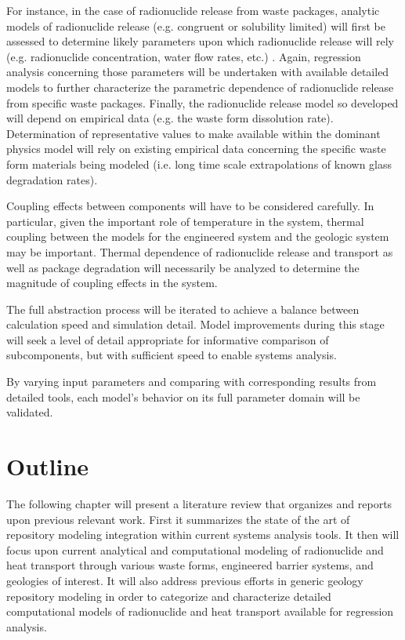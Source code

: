 
For instance, in the case of radionuclide release from waste packages, analytic 
models of radionuclide release (e.g.  congruent or solubility limited) will 
first be assessed to determine likely parameters upon which radionuclide release 
will rely (e.g.  radionuclide concentration, water flow rates, etc.) 
\cite{kawasaki_congruent_2004}.  Again, regression analysis concerning those 
parameters will be undertaken with available detailed models to further 
characterize the parametric dependence of radionuclide release from specific 
waste packages.  Finally, the radionuclide release model so developed will 
depend on empirical data (e.g. the waste form dissolution rate).  Determination 
of representative values to make available within the dominant physics model 
will rely on existing empirical data concerning the specific waste form  
materials being modeled (i.e. long time scale extrapolations of known glass 
degradation rates).  


Coupling effects between components will have to be considered carefully.  In 
particular, given the important role of temperature in the system, thermal 
coupling between the models for the engineered system and the geologic system 
may be important. Thermal dependence of radionuclide release and transport as 
well as package degradation will necessarily be analyzed to determine the 
magnitude of coupling effects in the system.


The full abstraction process will be iterated to achieve a balance between 
calculation speed and simulation detail. Model improvements during this stage 
will seek a
level of detail appropriate for informative comparison of subcomponents, but 
with sufficient speed to enable systems analysis. 


By varying input parameters and comparing with corresponding results from 
detailed tools, each model's behavior on its full parameter domain will be 
validated.


\section{Outline}


The following chapter will present a literature review that organizes and 
reports upon previous relevant work. First it summarizes the state of the art of 
repository modeling integration within current systems analysis tools. It then 
will focus upon current analytical and computational modeling of radionuclide 
and heat transport through various waste forms, engineered barrier systems, and 
geologies of interest.  It will also address previous efforts in generic geology 
repository modeling in order to categorize and characterize detailed 
computational models of radionuclide and heat transport available for 
regression analysis.

